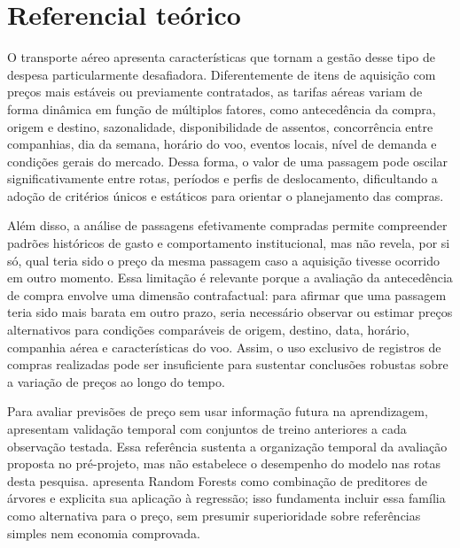 \section{Referencial teórico}

O transporte aéreo apresenta características que tornam a gestão desse tipo de despesa particularmente desafiadora. Diferentemente de itens de aquisição com preços mais estáveis ou previamente contratados, as tarifas aéreas variam de forma dinâmica em função de múltiplos fatores, como antecedência da compra, origem e destino, sazonalidade, disponibilidade de assentos, concorrência entre companhias, dia da semana, horário do voo, eventos locais, nível de demanda e condições gerais do mercado. Dessa forma, o valor de uma passagem pode oscilar significativamente entre rotas, períodos e perfis de deslocamento, dificultando a adoção de critérios únicos e estáticos para orientar o planejamento das compras.

Além disso, a análise de passagens efetivamente compradas permite compreender padrões históricos de gasto e comportamento institucional, mas não revela, por si só, qual teria sido o preço da mesma passagem caso a aquisição tivesse ocorrido em outro momento. Essa limitação é relevante porque a avaliação da antecedência de compra envolve uma dimensão contrafactual: para afirmar que uma passagem teria sido mais barata em outro prazo, seria necessário observar ou estimar preços alternativos para condições comparáveis de origem, destino, data, horário, companhia aérea e características do voo. Assim, o uso exclusivo de registros de compras realizadas pode ser insuficiente para sustentar conclusões robustas sobre a variação de preços ao longo do tempo.

Para avaliar previsões de preço sem usar informação futura na aprendizagem,  apresentam validação temporal com conjuntos de treino anteriores a cada observação testada. Essa referência sustenta a organização temporal da avaliação proposta no pré-projeto, mas não estabelece o desempenho do modelo nas rotas desta pesquisa.  apresenta Random Forests como combinação de preditores de árvores e explicita sua aplicação à regressão; isso fundamenta incluir essa família como alternativa para o preço, sem presumir superioridade sobre referências simples nem economia comprovada.

